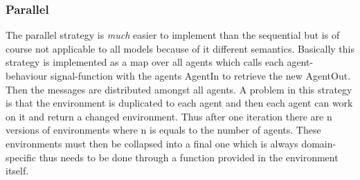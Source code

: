 \subsubsection{Parallel}
The parallel strategy is \textit{much} easier to implement than the sequential but is of course not applicable to all models because of it different semantics. Basically this strategy is implemented as a map over all agents which calls each agent-behaviour signal-function with the agents AgentIn to retrieve the new AgentOut. Then the messages are distributed amongst all agents.
A problem in this strategy is that the environment is duplicated to each agent and then each agent can work on it and return a changed environment. Thus after one iteration there are n versions of environments where n is equals to the number of agents. These environments must then be collapsed into a final one which is always domain-specific thus needs to be done through a function provided in the environment itself.

